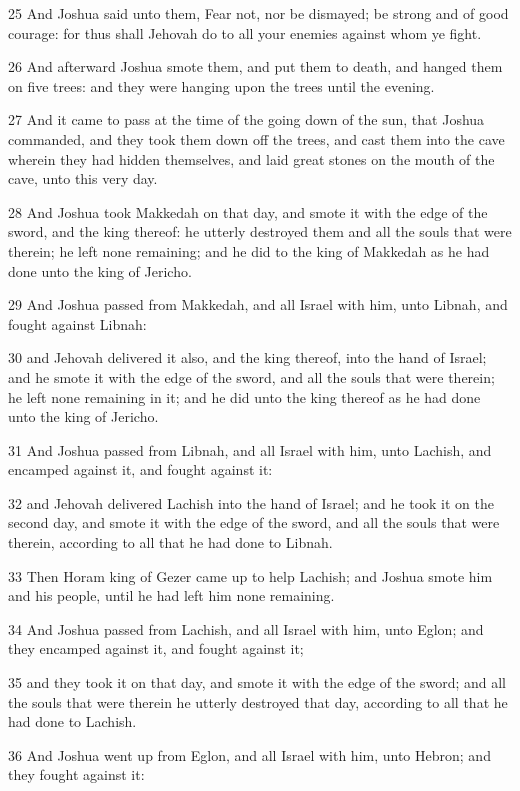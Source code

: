 \par 25 And Joshua said unto them, Fear not, nor be dismayed; be strong and of good courage: for thus shall Jehovah do to all your enemies against whom ye fight.
\par 26 And afterward Joshua smote them, and put them to death, and hanged them on five trees: and they were hanging upon the trees until the evening.
\par 27 And it came to pass at the time of the going down of the sun, that Joshua commanded, and they took them down off the trees, and cast them into the cave wherein they had hidden themselves, and laid great stones on the mouth of the cave, unto this very day.
\par 28 And Joshua took Makkedah on that day, and smote it with the edge of the sword, and the king thereof: he utterly destroyed them and all the souls that were therein; he left none remaining; and he did to the king of Makkedah as he had done unto the king of Jericho.
\par 29 And Joshua passed from Makkedah, and all Israel with him, unto Libnah, and fought against Libnah:
\par 30 and Jehovah delivered it also, and the king thereof, into the hand of Israel; and he smote it with the edge of the sword, and all the souls that were therein; he left none remaining in it; and he did unto the king thereof as he had done unto the king of Jericho.
\par 31 And Joshua passed from Libnah, and all Israel with him, unto Lachish, and encamped against it, and fought against it:
\par 32 and Jehovah delivered Lachish into the hand of Israel; and he took it on the second day, and smote it with the edge of the sword, and all the souls that were therein, according to all that he had done to Libnah.
\par 33 Then Horam king of Gezer came up to help Lachish; and Joshua smote him and his people, until he had left him none remaining.
\par 34 And Joshua passed from Lachish, and all Israel with him, unto Eglon; and they encamped against it, and fought against it;
\par 35 and they took it on that day, and smote it with the edge of the sword; and all the souls that were therein he utterly destroyed that day, according to all that he had done to Lachish.
\par 36 And Joshua went up from Eglon, and all Israel with him, unto Hebron; and they fought against it:
